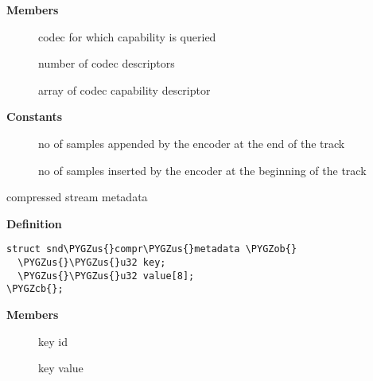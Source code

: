 \documentclass[a4paper,8pt,english]{sphinxmanual}
\def\PYGZus{\char`\_}
\def\PYGZob{\char`\{}
\def\PYGZcb{\char`\}}
\begin{document}
\textbf{Members}
\begin{description}
\item[{}] \leavevmode
codec for which capability is queried

\item[{}] \leavevmode
number of codec descriptors

\item[{}] \leavevmode
array of codec capability descriptor

\end{description}

\begin{fulllineitems}
\label{sound/kernel-api/alsa-driver-api:c.sndrv_compress_encoder}
\end{fulllineitems}


\textbf{Constants}
\begin{description}
\item[{}] \leavevmode
no of samples appended by the encoder at the
end of the track

\item[{}] \leavevmode
no of samples inserted by the encoder at the
beginning of the track

\end{description}

\begin{fulllineitems}
\label{sound/kernel-api/alsa-driver-api:c.snd_compr_metadata}
compressed stream metadata

\end{fulllineitems}


\textbf{Definition}

\begin{Verbatim}[commandchars=\\\{\}]
struct snd\PYGZus{}compr\PYGZus{}metadata \PYGZob{}
  \PYGZus{}\PYGZus{}u32 key;
  \PYGZus{}\PYGZus{}u32 value[8];
\PYGZcb{};
\end{Verbatim}

\textbf{Members}
\begin{description}
\item[{}] \leavevmode
key id

\item[{}] \leavevmode
key value

\end{description}
\end{document}
